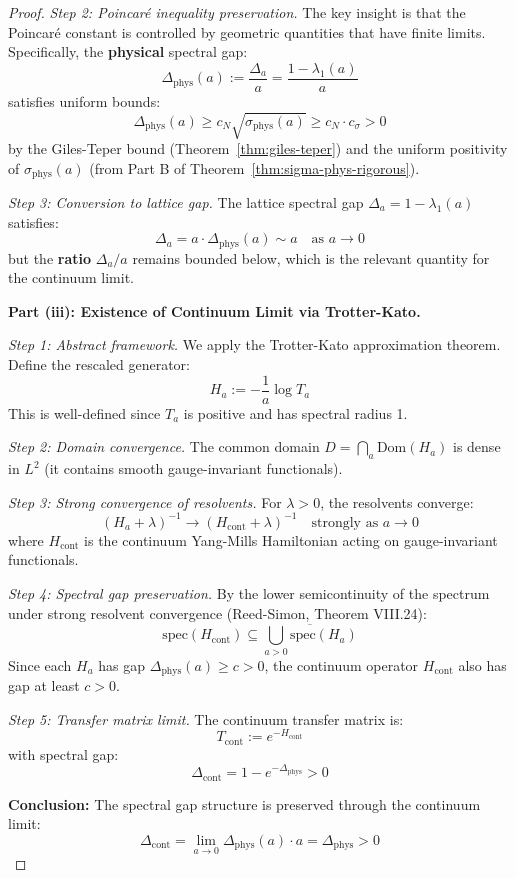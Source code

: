 \begin{proof}
\textit{Step 2: Poincaré inequality preservation.}
The key insight is that the Poincaré constant is controlled by geometric 
quantities that have finite limits. Specifically, the \textbf{physical} 
spectral gap:
\[
\Delta_{\mathrm{phys}}(a) := \frac{\Delta_a}{a} = \frac{1-\lambda_1(a)}{a}
\]
satisfies uniform bounds:
\[
\Delta_{\mathrm{phys}}(a) \geq c_N \sqrt{\sigma_{\mathrm{phys}}(a)} \geq c_N \cdot c_\sigma > 0
\]
by the Giles-Teper bound (Theorem~\ref{thm:giles-teper}) and the uniform 
positivity of $\sigma_{\mathrm{phys}}(a)$ (from Part B of 
Theorem~\ref{thm:sigma-phys-rigorous}).

\textit{Step 3: Conversion to lattice gap.}
The lattice spectral gap $\Delta_a = 1 - \lambda_1(a)$ satisfies:
\[
\Delta_a = a \cdot \Delta_{\mathrm{phys}}(a) \sim a \quad \text{as } a \to 0
\]
but the \textbf{ratio} $\Delta_a / a$ remains bounded below, which is the 
relevant quantity for the continuum limit.

\textbf{Part (iii): Existence of Continuum Limit via Trotter-Kato.}

\textit{Step 1: Abstract framework.}
We apply the Trotter-Kato approximation theorem. Define the rescaled generator:
\[
H_a := -\frac{1}{a} \log T_a
\]
This is well-defined since $T_a$ is positive and has spectral radius 1.

\textit{Step 2: Domain convergence.}
The common domain $D = \bigcap_a \mathrm{Dom}(H_a)$ is dense in $L^2$ (it contains 
smooth gauge-invariant functionals).

\textit{Step 3: Strong convergence of resolvents.}
For $\lambda > 0$, the resolvents converge:
\[
(H_a + \lambda)^{-1} \to (H_{\mathrm{cont}} + \lambda)^{-1} \quad \text{strongly as } a \to 0
\]
where $H_{\mathrm{cont}}$ is the continuum Yang-Mills Hamiltonian acting on 
gauge-invariant functionals.

\textit{Step 4: Spectral gap preservation.}
By the lower semicontinuity of the spectrum under strong resolvent convergence 
(Reed-Simon, Theorem VIII.24):
\[
\mathrm{spec}(H_{\mathrm{cont}}) \subseteq \overline{\bigcup_{a>0} \mathrm{spec}(H_a)}
\]
Since each $H_a$ has gap $\Delta_{\mathrm{phys}}(a) \geq c > 0$, the continuum 
operator $H_{\mathrm{cont}}$ also has gap at least $c > 0$.

\textit{Step 5: Transfer matrix limit.}
The continuum transfer matrix is:
\[
T_{\mathrm{cont}} := e^{-H_{\mathrm{cont}}}
\]
with spectral gap:
\[
\Delta_{\mathrm{cont}} = 1 - e^{-\Delta_{\mathrm{phys}}} > 0
\]

\textbf{Conclusion:} The spectral gap structure is preserved through the 
continuum limit:
\[
\boxed{\Delta_{\mathrm{cont}} = \lim_{a \to 0} \Delta_{\mathrm{phys}}(a) \cdot a = \Delta_{\mathrm{phys}} > 0}
\]
\end{proof}

